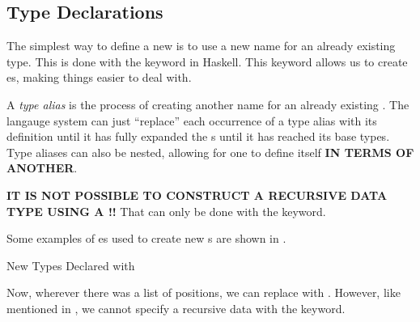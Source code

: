 \subsection{Type Declarations}\label{subsec:Type_Declarations}
The simplest way to define a new  is to use a new name for an already existing type.
This is done with the  keyword in Haskell.
This keyword allows us to create es, making things easier to deal with.

\begin{definition}\label{def:Type_Alias}
  A \emph{type alias} is the process of creating another name for an already existing .
  The langauge system can just ``replace'' each occurrence of a type alias with its definition until it has fully expanded the s until it has reached its base types.
  Type aliases can also be nested, allowing for one to define itself \textbf{IN TERMS OF ANOTHER}.

  \begin{remark}\label{rmk:Recursive_Type_Alias}
    \textbf{IT IS NOT POSSIBLE TO CONSTRUCT A RECURSIVE DATA TYPE USING A !!}
    That can only be done with the  keyword.
  \end{remark}
\end{definition}

Some examples of es used to create new s are shown in .

\begin{listing}[h!tbp]
\caption{New Types Declared with }
\label{lst:New_Type-Type}
\end{listing}

Now, wherever there was a list of positions, we can replace \haskellinline{[Position]} with .
However, like mentioned in , we cannot specify a recursive data  with the  keyword.


